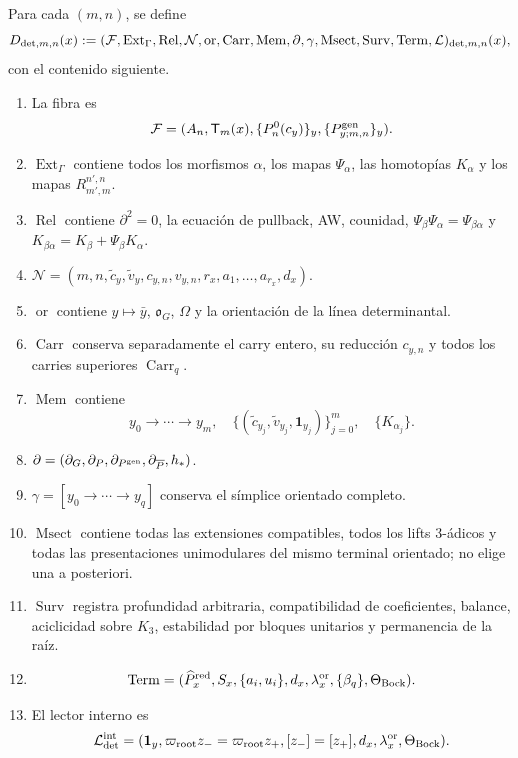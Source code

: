 Para cada \((m,n)\), se define
\begin{equation}\label{eq:detint-d-trece}
 D_{{\rm det},m,n}(x):=
 (\mathcal F,\operatorname{Ext}_\Gamma,\operatorname{Rel},
 \mathcal N,\operatorname{or},\operatorname{Carr},\operatorname{Mem},
 \partial,\gamma,\operatorname{Msect},\operatorname{Surv},
 \operatorname{Term},\mathcal L)_{{\rm det},m,n}(x),
\end{equation}
con el contenido siguiente.
\begin{enumerate}
 \item La fibra es
 \[
  \mathcal F=(A_n,\mathsf T_m(x),
  \{P_n^0(c_y)\}_y,\{P^{\rm gen}_{y;m,n}\}_y).
 \]
 \item \(\operatorname{Ext}_\Gamma\) contiene todos los morfismos
 \(\alpha\), los mapas \(\Psi_\alpha\), las homotopías \(K_\alpha\) y
 los mapas \(R_{m',m}^{n',n}\).
 \item \(\operatorname{Rel}\) contiene \(\partial^2=0\), la ecuación de
 pullback, AW, counidad, \(\Psi_\beta\Psi_\alpha=\Psi_{\beta\alpha}\) y
 \(K_{\beta\alpha}=K_\beta+\Psi_\beta K_\alpha\).
 \item
 \(\mathcal N=(m,n,\widetilde c_y,\widetilde v_y,c_{y,n},v_{y,n},
 r_x,a_1,\ldots,a_{r_x},d_x)\).
 \item \(\operatorname{or}\) contiene \(y\mapsto\bar y\),
 \(\mathfrak o_G\), \(\Omega\) y la orientación de la línea
 determinantal.
 \item \(\operatorname{Carr}\) conserva separadamente el carry entero,
 su reducción \(c_{y,n}\) y todos los carries superiores
 \(\operatorname{Carr}_q\).
 \item \(\operatorname{Mem}\) contiene
 \[
  y_0\to\cdots\to y_m,
  \quad\{(\widetilde c_{y_j},\widetilde v_{y_j},\mathbf1_{y_j})\}_{j=0}^m,
  \quad\{K_{\alpha_j}\}.
 \]
 \item
 \(\partial=(\partial_G,\partial_P,\partial_{P^{\rm gen}},
 \partial_{\overline P},h_*)\).
 \item \(\gamma=[y_0\to\cdots\to y_q]\) conserva el símplice orientado
 completo.
 \item \(\operatorname{Msect}\) contiene todas las extensiones
 compatibles, todos los lifts \(3\)-ádicos y todas las presentaciones
 unimodulares del mismo terminal orientado; no elige una a posteriori.
 \item \(\operatorname{Surv}\) registra profundidad arbitraria,
 compatibilidad de coeficientes, balance, aciclicidad sobre \(K_3\),
 estabilidad por bloques unitarios y permanencia de la raíz.
 \item
 \[
  \operatorname{Term}=(\widehat P_x^{\rm red},S_x,
  \{a_i,u_i\},d_x,\lambda_x^{\rm or},
  \{\beta_q\},\Theta_{\rm Bock}).
 \]
 \item El lector interno es
 \[
  \mathcal L_{\rm det}^{\rm int}
  =(\mathbf1_y,
  \varpi_{\rm root}z_-=\varpi_{\rm root}z_+,
  [z_-]=[z_+],d_x,\lambda_x^{\rm or},\Theta_{\rm Bock}).
 \]
\end{enumerate}

